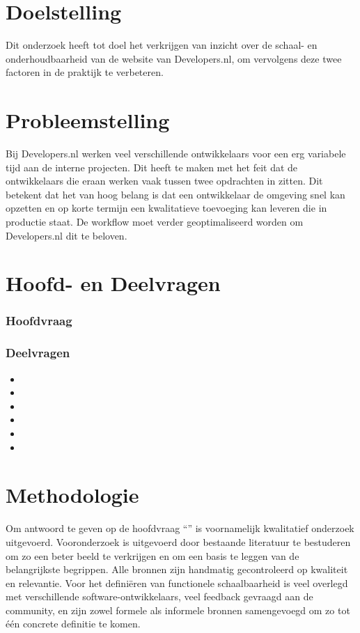 \section{Doelstelling}
Dit onderzoek heeft tot doel het verkrijgen van inzicht over de schaal- en onderhoudbaarheid van de website van Developers.nl, om vervolgens deze twee factoren in de praktijk te verbeteren.

\section{Probleemstelling}
Bij Developers.nl werken veel verschillende ontwikkelaars voor een erg variabele tijd aan de interne projecten. Dit heeft te maken met het feit dat de ontwikkelaars die eraan werken vaak tussen twee opdrachten in zitten. Dit betekent dat het van hoog belang is dat een ontwikkelaar de omgeving snel kan opzetten en op korte termijn een kwalitatieve toevoeging kan leveren die in productie staat. De workflow moet verder geoptimaliseerd worden om Developers.nl dit te beloven.

\section{Hoofd- en Deelvragen}
\subsubsection{Hoofdvraag}
\hoofdvraagname

\subsubsection{Deelvragen}
\begin{itemize}
	\item \deelverwachtingen
	\item \deeltechnieken
	\item \deelhuidig
	\item \deelverbetering
	\item \deelimplementatie
	\item \deelrequirements
\end{itemize}

\section{Methodologie}
Om antwoord te geven op de hoofdvraag \enquote{\hoofdvraagname} is voornamelijk kwalitatief onderzoek uitgevoerd. Vooronderzoek is uitgevoerd door bestaande literatuur te bestuderen om zo een beter beeld te verkrijgen en om een basis te leggen van de belangrijkste begrippen. Alle bronnen zijn handmatig gecontroleerd op kwaliteit en relevantie. Voor het definiëren van functionele schaalbaarheid is veel overlegd met verschillende software-ontwikkelaars, veel feedback gevraagd aan de community, en zijn zowel formele als informele bronnen samengevoegd om zo tot één concrete definitie te komen. 

